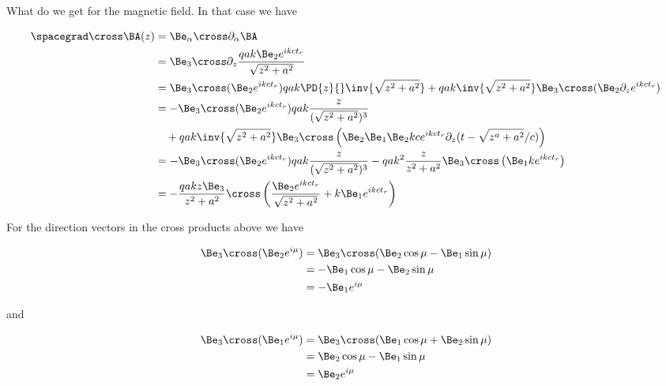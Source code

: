 {What do we get for the magnetic field.  In that case we have

\begin{equation}\label{eqn:relativisticElectrodynamicsExamReflection:1190}
\begin{aligned}
\spacegrad \cross \BA(z)
&=
\Be_\alpha \cross \partial_\alpha \BA \\
&=
\Be_3 \cross \partial_z \frac{q a k \Be_2 e^{i k c t_r} }{\sqrt{z^2 + a^2}}  \\
&=
\Be_3 \cross (\Be_2 e^{i  k c t_r} ) q a  k \PD{z}{} \inv{\sqrt{z^2 + a^2}} 
+
q a  k \inv{\sqrt{z^2 + a^2}} \Be_3 \cross (\Be_2 \partial_z e^{i  k c t_r} ) \\
&=
-\Be_3 \cross (\Be_2 e^{i  k c t_r} ) q a  k \frac{z}{(\sqrt{z^2 + a^2})^3} \\
&\quad +
q a  k \inv{\sqrt{z^2 + a^2}} \Be_3 \cross \left( \Be_2 \Be_1 \Be_2 k c e^{i  k c t_r} \partial_z ( t - \sqrt{z^a + a^2}/c ) \right) \\
&=
-\Be_3 \cross (\Be_2 e^{i  k c t_r} ) q a  k \frac{z}{(\sqrt{z^2 + a^2})^3} 
-
q a  k^2 \frac{z}{z^2 + a^2} \Be_3 \cross \left( \Be_1 k e^{i  k c t_r} \right) \\
&=
-\frac{q a k z \Be_3}{z^2 + a^2} \cross \left( 
\frac{ \Be_2 e^{i k c t_r} }{\sqrt{z^2 + a^2}} + k \Be_1 e^{i k c t_r} 
\right)
\end{aligned}
\end{equation}

For the direction vectors in the cross products above we have

\begin{equation}\label{eqn:relativisticElectrodynamicsExamReflection:1210}
\begin{aligned}
\Be_3 \cross (\Be_2 e^{i \mu})
&=
\Be_3 \cross (\Be_2 \cos\mu - \Be_1 \sin\mu) \\
&=
-\Be_1 \cos\mu - \Be_2 \sin\mu \\
&=
-\Be_1 e^{i \mu}
\end{aligned}
\end{equation}

and

\begin{equation}\label{eqn:relativisticElectrodynamicsExamReflection:1230}
\begin{aligned}
\Be_3 \cross (\Be_1 e^{i \mu})
&=
\Be_3 \cross (\Be_1 \cos\mu + \Be_2 \sin\mu) \\
&=
\Be_2 \cos\mu - \Be_1 \sin\mu \\
&=
\Be_2 e^{i \mu}
\end{aligned}
\end{equation}

}

